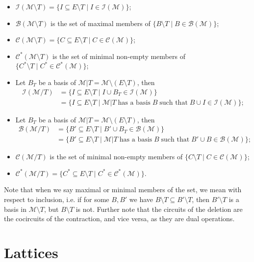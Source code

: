 \documentclass[12pt]{report}
\theoremstyle{definition}
\def\calB{\mathcal B}
\def\calC{\mathcal C}
\def\calI{\mathcal I}
\def\calM{\mathcal M}
\theoremstyle{upright}
\begin{document}
\begin{itemize}
    \item $\calI(\calM\setminus T)=\{I\subseteq E\setminus T\;|\;I\in\calI(\calM)\}$;
    \item $\calB(\calM\setminus T)$ is the set of maximal members of $\{B\setminus T\;|\;B\in\calB(\calM)\}$;
    \item $\calC(\calM\setminus T)=\{C\subseteq E\setminus T\;|\;C\in\calC(\calM)\}$;
    \item $\calC^*(\calM\setminus T)$ is the set of minimal non-empty members of $\{C^*\setminus T\;|\;C^*\in\calC^*(\calM)\}$;
    \item Let $B_T$ be a basis of $\calM|T=\calM\setminus(E\setminus T)$, then
    \[\begin{aligned}
        \calI(\calM/T)&=\{I\subseteq E\setminus T\;|\;I\cup B_T\in\calI(\calM)\}\\
        &=\{I\subseteq E\setminus T\;|\;\calM|T\;\text{has a basis}\;B\;\text{such that}\;B\cup I\in\calI(\calM)\};
    \end{aligned}\]
    \item Let $B_T$ be a basis of $\calM|T=\calM\setminus(E\setminus T)$, then
    \[\begin{aligned}
        \calB(\calM/T)&=\{B'\subseteq E\setminus T\;|\;B'\cup B_T\in\calB(\calM)\}\\
        &=\{B'\subseteq E\setminus T\;|\;\calM|T\;\text{has a basis}\;B\;\text{such that}\;B'\cup B\in\calB(\calM)\};
    \end{aligned}\]
    \item $\calC(\calM/T)$ is the set of minimal non-empty members of $\{C\setminus T\;|\;C\in\calC(\calM)\}$;
    \item $\calC^*(\calM/T)=\{C^*\subseteq E\setminus T\;|\;C^*\in\calC^*(\calM)\}$.
\end{itemize}

Note that when we say maximal or minimal members of the set, we mean with respect to inclusion, i.e. if for some $B, B'$ we have $B\setminus T\subseteq B'\setminus T$, then $B'\setminus T$ is a basis in $\calM\setminus T$, but $B\setminus T$ is not.
Further note that the circuits of the deletion are the cocircuits of the contraction, and vice versa, as they are dual operations.

\newpage

\chapter{Lattices}
\label{chap:Lattices}
\end{document}
